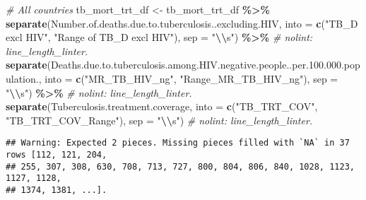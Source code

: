 \documentclass[
]{article}
\newenvironment{Shaded}{\begin{snugshade}}{\end{snugshade}}
\newcommand{\AttributeTok}[1]{\textcolor[rgb]{0.13,0.29,0.53}{#1}}
\newcommand{\CommentTok}[1]{\textcolor[rgb]{0.56,0.35,0.01}{\textit{#1}}}
\newcommand{\FunctionTok}[1]{\textcolor[rgb]{0.13,0.29,0.53}{\textbf{#1}}}
\newcommand{\NormalTok}[1]{#1}
\newcommand{\OtherTok}[1]{\textcolor[rgb]{0.56,0.35,0.01}{#1}}
\newcommand{\SpecialCharTok}[1]{\textcolor[rgb]{0.81,0.36,0.00}{\textbf{#1}}}
\newcommand{\StringTok}[1]{\textcolor[rgb]{0.31,0.60,0.02}{#1}}
\begin{document}
\begin{Shaded}
\begin{Highlighting}[]
\CommentTok{\# All countries}
\NormalTok{tb\_mort\_trt\_df }\OtherTok{\textless{}{-}}\NormalTok{ tb\_mort\_trt\_df }\SpecialCharTok{\%\textgreater{}\%}
  \FunctionTok{separate}\NormalTok{(Number.of.deaths.due.to.tuberculosis..excluding.HIV, }\AttributeTok{into =} \FunctionTok{c}\NormalTok{(}\StringTok{"TB\_D excl HIV"}\NormalTok{, }\StringTok{"Range of TB\_D excl HIV"}\NormalTok{), }\AttributeTok{sep =} \StringTok{"}\SpecialCharTok{\textbackslash{}\textbackslash{}}\StringTok{s"}\NormalTok{) }\SpecialCharTok{\%\textgreater{}\%} \CommentTok{\# nolint: line\_length\_linter.}
  \FunctionTok{separate}\NormalTok{(}\StringTok{\textasciigrave{}}\AttributeTok{Deaths.due.to.tuberculosis.among.HIV.negative.people..per.100.000.population.}\StringTok{\textasciigrave{}}\NormalTok{, }\AttributeTok{into =} \FunctionTok{c}\NormalTok{(}\StringTok{"MR\_TB\_HIV\_ng"}\NormalTok{, }\StringTok{"Range\_MR\_TB\_HIV\_ng"}\NormalTok{), }\AttributeTok{sep =} \StringTok{"}\SpecialCharTok{\textbackslash{}\textbackslash{}}\StringTok{s"}\NormalTok{) }\SpecialCharTok{\%\textgreater{}\%} \CommentTok{\# nolint: line\_length\_linter.}
  \FunctionTok{separate}\NormalTok{(Tuberculosis.treatment.coverage, }\AttributeTok{into =} \FunctionTok{c}\NormalTok{(}\StringTok{"TB\_TRT\_COV"}\NormalTok{, }\StringTok{"TB\_TRT\_COV\_Range"}\NormalTok{), }\AttributeTok{sep =} \StringTok{"}\SpecialCharTok{\textbackslash{}\textbackslash{}}\StringTok{s"}\NormalTok{) }\CommentTok{\# nolint: line\_length\_linter.}
\end{Highlighting}
\end{Shaded}

\begin{verbatim}
## Warning: Expected 2 pieces. Missing pieces filled with `NA` in 37 rows [112, 121, 204,
## 255, 307, 308, 630, 708, 713, 727, 800, 804, 806, 840, 1028, 1123, 1127, 1128,
## 1374, 1381, ...].
\end{verbatim}
\end{document}
